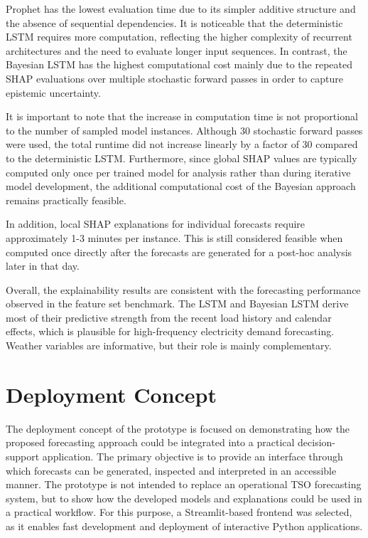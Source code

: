 \documentclass[Master,english,IEEE]{twbook}
\begin{document}
Prophet has the lowest evaluation time due to its simpler additive structure and the absence of sequential dependencies. It is noticeable that the deterministic LSTM requires more computation, reflecting the higher complexity of recurrent architectures and the need to evaluate longer input sequences. In contrast, the Bayesian LSTM has the highest computational cost mainly due to the repeated SHAP evaluations over multiple stochastic forward passes in order to capture epistemic uncertainty.

It is important to note that the increase in computation time is not proportional to the number of sampled model instances. Although 30 stochastic forward passes were used, the total runtime did not increase linearly by a factor of 30 compared to the deterministic LSTM. Furthermore, since global SHAP values are typically computed only once per trained model for analysis rather than during iterative model development, the additional computational cost of the Bayesian approach remains practically feasible. 

In addition, local SHAP explanations for individual forecasts require approximately 1-3 minutes per instance. This is still considered feasible when computed once directly after the forecasts are generated for a post-hoc analysis later in that day.

Overall, the explainability results are consistent with the forecasting performance observed in the feature set benchmark. The LSTM and Bayesian LSTM derive most of their predictive strength from the recent load history and calendar effects, which is plausible for high-frequency electricity demand forecasting. Weather variables are informative, but their role is mainly complementary.

\section{Deployment Concept}
\label{sec:deployment-concept}

The deployment concept of the prototype is focused on demonstrating how the proposed forecasting approach could be integrated into a practical decision-support application. The primary objective is to provide an interface through which forecasts can be generated, inspected and interpreted in an accessible manner. The prototype is not intended to replace an operational TSO forecasting system, but to show how the developed models and explanations could be used in a practical workflow. For this purpose, a Streamlit-based frontend was selected, as it enables fast development and deployment of interactive Python applications.
\end{document}

